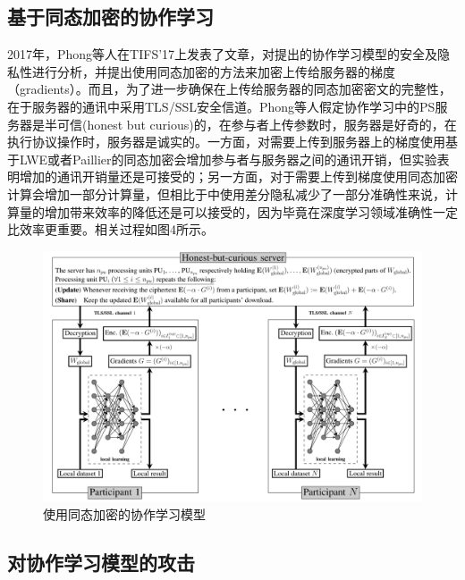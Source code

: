 \documentclass[a4paper]{article}
\begin{document}
\subsection{基于同态加密的协作学习}
2017年，Phong等人在TIFS'17上发表了文章\cite{Phong2017PrivacyPreservingDL}，对\cite{shokri2015privacy}提出的协作学习模型的安全及隐私性进行分析，并提出使用同态加密的方法来加密上传给服务器的梯度（gradients）。而且，为了进一步确保在上传给服务器的同态加密密文的完整性，在于服务器的通讯中采用TLS/SSL安全信道。Phong等人假定协作学习中的PS服务器是半可信(honest but curious)的，在参与者上传参数时，服务器是好奇的，在执行协议操作时，服务器是诚实的。一方面，对需要上传到服务器上的梯度使用基于LWE或者Paillier的同态加密会增加参与者与服务器之间的通讯开销，但实验表明增加的通讯开销量还是可接受的；另一方面，对于需要上传到梯度使用同态加密计算会增加一部分计算量，但相比于\cite{shokri2015privacy}中使用差分隐私减少了一部分准确性来说，计算量的增加带来效率的降低还是可以接受的，因为毕竟在深度学习领域准确性一定比效率更重要。相关过程如图4所示。

\begin{figure}[!ht]
\includegraphics[width = \linewidth]{fig/TIFS17.png}
\caption{使用同态加密的协作学习模型}
\label{fig:TIFS17}
\end{figure}

\subsection{对协作学习模型的攻击}
\end{document}
